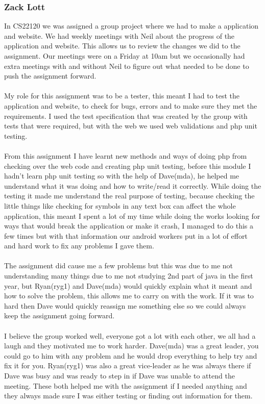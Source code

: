 \documentclass[12pt]{article}
\begin{document}
\subsubsection{Zack Lott}
In CS22120 we was assigned a group project where we had to make a application and website.
We had weekly meetings with Neil about the progress of the application and website. This allows us to review the changes we did to the assignment. Our meetings were on a Friday at 10am but we occasionally had extra meetings with and without Neil to figure out what needed to be done to push the assignment forward. 
~\\\\
My role for this assignment was to be a tester, this meant I had to test the application and website, to check for bugs, errors and to make sure they met the requirements. I used the test specification that was created by the group with tests that were required, but with the web we used web validations and php unit testing.
~\\\\
From this assignment I have learnt new methods and ways of doing php from checking over the web code and creating php unit testing, before this module I hadn't learn php unit testing so with the help of Dave(mda), he helped me understand what it was doing and how to write/read it correctly. While doing the testing it made me understand the real purpose of testing, because checking the little things like checking for symbols in any text box can affect the whole application, this meant I spent a lot of my time while doing the works looking for ways that would break the application or make it crash, I managed to do this a few times but with that information our android workers put in a lot of effort and hard work to fix any problems I gave them.
~\\\\
The assignment did cause me a few problems but this was due to me not understanding many things due to me not studying 2nd part of java in the first year, but Ryan(ryg1) and Dave(mda) would quickly explain what it meant and how to solve the problem, this allows me to carry on with the work. If it was to hard then Dave would quickly reassign me something else so we could always keep the assignment going forward.  
~\\\\
I believe the group worked well, everyone got a lot with each other, we all had a laugh and they motivated me to work harder. Dave(mda) was a great leader, you could go to him with any problem and he would drop everything to help try and fix it for you. Ryan(ryg1) was also a great vice-leader as he was always there if Dave was busy and was ready to step in if Dave was unable to attend the meeting. These both helped me with the assignment if I needed anything and they always made sure I was either testing or finding out information for them. 
\end{document}
